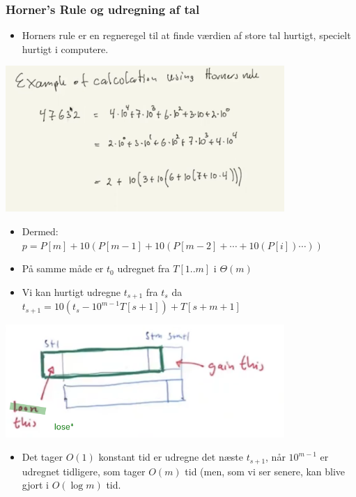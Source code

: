 \documentclass{beamer}
\begin{document}
\begin{frame}[allowframebreaks]
  \frametitle{Horner's Rule og udregning af tal}
  \begin{itemize}
  \item Horners rule er en regneregel til at finde værdien af store tal hurtigt, specielt hurtigt i computere. 
  \end{itemize}
  \begin{center}
    \includegraphics[width=300pt]{main--the-naive-string-matching-algorithm--rabin-karp-c553.png} 
  \end{center}
  \begin{itemize}
  \item Dermed: $p = P[m] + 10(P[m-1] + 10(P[m-2]+ \cdots + 10(P[i])\cdots))$
  \item På samme måde er $t_{0}$ udregnet fra $T[1..m]$ i $\Theta(m)$
  \item Vi kan hurtigt udregne $t_{s+1}$ fra $t_{s}$ da $t_{s+1} = 10(t_{s}-10^{m-1}T[s+1])+T[s+m+1]$
  \end{itemize}
  \includegraphics[width=300pt]{main--the-naive-string-matching-algorithm--rabin-karp-44af.png}
  \begin{itemize}
  \item Det tager $O(1)$ konstant tid er udregne det næste $t_{s+1}$, når $10^{m-1}$ er udregnet tidligere, som tager $O(m)$ tid (men, som vi ser senere, kan blive gjort i $O(\log m)$ tid.
  \end{itemize}
\end{frame}
\end{document}

